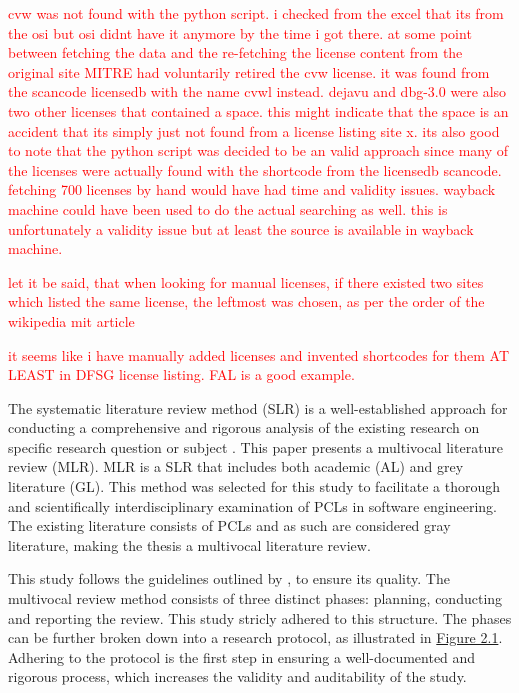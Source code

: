 \textcolor{red}{cvw was not found with the python script. i checked from the excel that its from the osi but osi didnt have it anymore by the time i got there. at some point between fetching the data and the re-fetching the license content from the original site MITRE had voluntarily retired the cvw license. it was found from the scancode licensedb with the name cvwl instead. dejavu and dbg-3.0 were also two other licenses that contained a space. this might indicate that the space is an accident that its simply just not found from a license listing site x. its also good to note that the python script was decided to be an valid approach since many of the licenses were actually found with the shortcode from the licensedb scancode. fetching 700 licenses by hand would have had time and validity issues. wayback machine could have been used to do the actual searching as well. this is unfortunately a validity issue but at least the source is available in wayback machine.}

\textcolor{red}{let it be said, that when looking for manual licenses, if there existed two sites which listed the same license, the leftmost was chosen, as per the order of the wikipedia mit article}

\textcolor{red}{it seems like i have manually added licenses and invented shortcodes for them AT LEAST in DFSG license listing. FAL is a good example.}

The systematic literature review method (SLR) is a well-established approach for conducting a comprehensive and rigorous analysis of the existing research on specific research question or subject \citep{kitchenham2007}. This paper presents a multivocal literature review (MLR). MLR is a SLR that includes both academic (AL) and grey literature (GL). This method was selected for this study to facilitate a thorough and scientifically interdisciplinary examination of PCLs in software engineering. The existing literature consists of PCLs and as such are considered gray literature, making the thesis a multivocal literature review.

This study follows the guidelines outlined by \cite{kitchenham2007}, to ensure its quality. The multivocal review method consists of three distinct phases: planning, conducting and reporting the review. This study stricly adhered to this structure. The phases can be further broken down into a research protocol, as illustrated in \hyperref[fig:slrphases]{Figure 2.1}. Adhering to the protocol is the first step in ensuring a well-documented and rigorous process, which increases the validity and auditability of the study.

